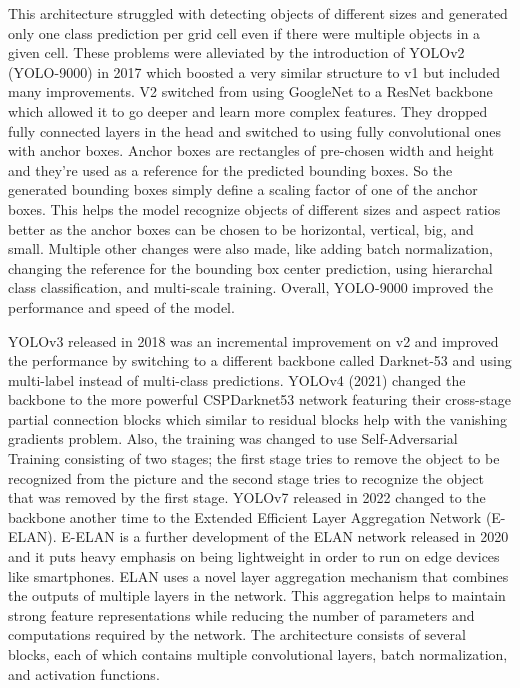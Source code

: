 This architecture struggled with detecting objects of different sizes and generated only one class prediction per grid cell even if there were multiple objects in a given cell. These problems were alleviated by the introduction of YOLOv2 (YOLO-9000) in 2017 \cite{redmon_yolo9000_2017} which boosted a very similar structure to v1 but included many improvements. V2 switched from using GoogleNet to a ResNet backbone \cite{he_deep_2016} which allowed it to go deeper and learn more complex features. They dropped fully connected layers in the head and switched to using fully convolutional ones with anchor boxes. Anchor boxes are rectangles of pre-chosen width and height and they're used as a reference for the predicted bounding boxes. So the generated bounding boxes simply define a scaling factor of one of the anchor boxes. This helps the model recognize objects of different sizes and aspect ratios better as the anchor boxes can be chosen to be horizontal, vertical, big, and small. Multiple other changes were also made, like adding batch normalization, changing the reference for the bounding box center prediction, using hierarchal class classification, and multi-scale training. Overall, YOLO-9000 improved the performance and speed of the model.

YOLOv3 \cite{redmon_yolov3_2018} released in 2018 was an incremental improvement on v2 and improved the performance by switching to a different backbone called Darknet-53 and using multi-label instead of multi-class predictions. YOLOv4 \cite{wang_scaled-yolov4_2021} (2021) changed the backbone to the more powerful CSPDarknet53 network featuring their cross-stage partial connection blocks which similar to residual blocks help with the vanishing gradients problem. Also, the training was changed to use Self-Adversarial Training consisting of two stages; the first stage tries to remove the object to be recognized from the picture and the second stage tries to recognize the object that was removed by the first stage. YOLOv7 \cite{wang_yolov7_2022} released in 2022 changed to the backbone another time to the Extended Efficient Layer Aggregation Network (E-ELAN). E-ELAN is a further development of the ELAN network released in 2020 and it puts heavy emphasis on being lightweight in order to run on edge devices like smartphones. ELAN uses a novel layer aggregation mechanism that combines the outputs of multiple layers in the network. This aggregation helps to maintain strong feature representations while reducing the number of parameters and computations required by the network. The architecture consists of several blocks, each of which contains multiple convolutional layers, batch normalization, and activation functions.

